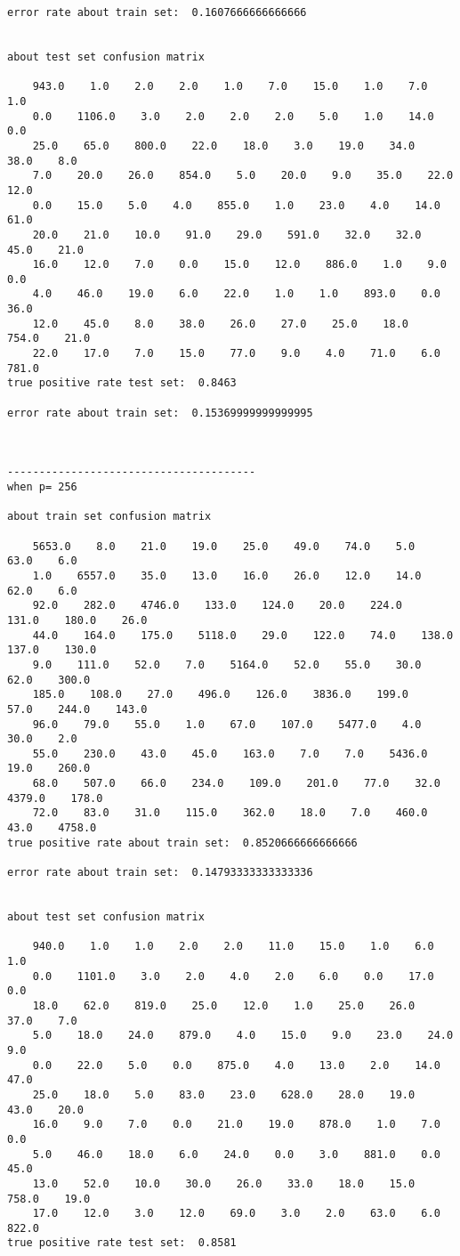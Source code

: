 \documentclass[11pt]{article}
\begin{document}
\begin{Verbatim}[commandchars=\\\{\}]
error rate about train set:  0.1607666666666666


about test set confusion matrix

    943.0    1.0    2.0    2.0    1.0    7.0    15.0    1.0    7.0    1.0
    0.0    1106.0    3.0    2.0    2.0    2.0    5.0    1.0    14.0    0.0
    25.0    65.0    800.0    22.0    18.0    3.0    19.0    34.0    38.0    8.0
    7.0    20.0    26.0    854.0    5.0    20.0    9.0    35.0    22.0    12.0
    0.0    15.0    5.0    4.0    855.0    1.0    23.0    4.0    14.0    61.0
    20.0    21.0    10.0    91.0    29.0    591.0    32.0    32.0    45.0    21.0
    16.0    12.0    7.0    0.0    15.0    12.0    886.0    1.0    9.0    0.0
    4.0    46.0    19.0    6.0    22.0    1.0    1.0    893.0    0.0    36.0
    12.0    45.0    8.0    38.0    26.0    27.0    25.0    18.0    754.0    21.0
    22.0    17.0    7.0    15.0    77.0    9.0    4.0    71.0    6.0    781.0
true positive rate test set:  0.8463

error rate about train set:  0.15369999999999995



---------------------------------------
when p= 256

about train set confusion matrix

    5653.0    8.0    21.0    19.0    25.0    49.0    74.0    5.0    63.0    6.0
    1.0    6557.0    35.0    13.0    16.0    26.0    12.0    14.0    62.0    6.0
    92.0    282.0    4746.0    133.0    124.0    20.0    224.0    131.0    180.0    26.0
    44.0    164.0    175.0    5118.0    29.0    122.0    74.0    138.0    137.0    130.0
    9.0    111.0    52.0    7.0    5164.0    52.0    55.0    30.0    62.0    300.0
    185.0    108.0    27.0    496.0    126.0    3836.0    199.0    57.0    244.0    143.0
    96.0    79.0    55.0    1.0    67.0    107.0    5477.0    4.0    30.0    2.0
    55.0    230.0    43.0    45.0    163.0    7.0    7.0    5436.0    19.0    260.0
    68.0    507.0    66.0    234.0    109.0    201.0    77.0    32.0    4379.0    178.0
    72.0    83.0    31.0    115.0    362.0    18.0    7.0    460.0    43.0    4758.0
true positive rate about train set:  0.8520666666666666

error rate about train set:  0.14793333333333336


about test set confusion matrix

    940.0    1.0    1.0    2.0    2.0    11.0    15.0    1.0    6.0    1.0
    0.0    1101.0    3.0    2.0    4.0    2.0    6.0    0.0    17.0    0.0
    18.0    62.0    819.0    25.0    12.0    1.0    25.0    26.0    37.0    7.0
    5.0    18.0    24.0    879.0    4.0    15.0    9.0    23.0    24.0    9.0
    0.0    22.0    5.0    0.0    875.0    4.0    13.0    2.0    14.0    47.0
    25.0    18.0    5.0    83.0    23.0    628.0    28.0    19.0    43.0    20.0
    16.0    9.0    7.0    0.0    21.0    19.0    878.0    1.0    7.0    0.0
    5.0    46.0    18.0    6.0    24.0    0.0    3.0    881.0    0.0    45.0
    13.0    52.0    10.0    30.0    26.0    33.0    18.0    15.0    758.0    19.0
    17.0    12.0    3.0    12.0    69.0    3.0    2.0    63.0    6.0    822.0
true positive rate test set:  0.8581


\end{Verbatim}
\end{document}

